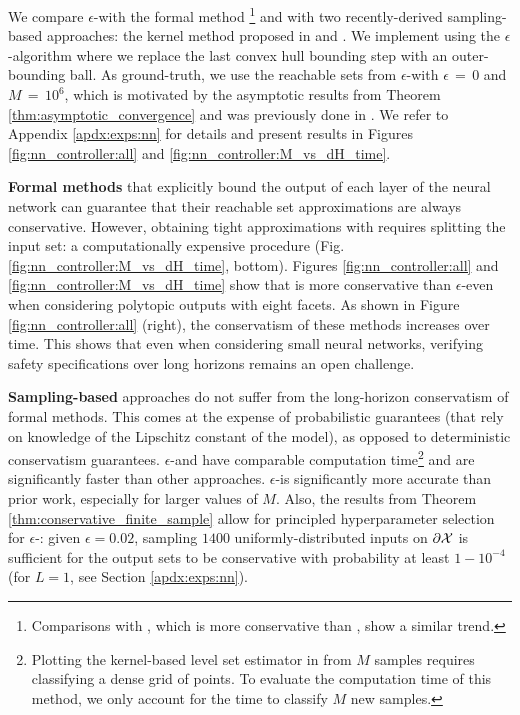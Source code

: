 \documentclass[12pt]{l4dc2022} %
\begin{document}
We compare $\epsilon$-\randup with the formal method \reachlp \citep{Everett21_journal}\footnote{Comparisons with \reachsdp \citep{Hu2020}, which is more conservative than \reachlp, show a similar trend.} %
% 
and with two recently-derived sampling-based approaches: the kernel method proposed in \citep{ThorpeL4DC2021} and \gotube \citep{Gruenbacher2021}. We implement \gotube using the $\epsilon$-\randup algorithm where we replace the last convex hull bounding step with an outer-bounding ball. 
As ground-truth, we use the reachable sets from $\epsilon$-\randup with $\epsilon\,{=}\,0$ and $M\,{=}\,10^6$, which is motivated by the asymptotic results from Theorem \ref{thm:asymptotic_convergence} and was previously done in \citep{Everett21_journal}. 
% 
 We refer to Appendix \ref{apdx:exps:nn} for details and present results in Figures \ref{fig:nn_controller:all} and \ref{fig:nn_controller:M_vs_dH_time}.

\textbf{Formal methods} that explicitly bound the output of each layer of the neural network can guarantee that %
their reachable set approximations are always conservative. %
However, obtaining tight approximations with \reachlp requires splitting the input set: a computationally expensive procedure (Fig.\,\ref{fig:nn_controller:M_vs_dH_time}, bottom). 
Figures \ref{fig:nn_controller:all}  and \ref{fig:nn_controller:M_vs_dH_time} show that \reachlp is more conservative than $\epsilon$-\randup even when considering polytopic outputs with eight facets. %
As shown in Figure \ref{fig:nn_controller:all} (right),  %
the conservatism of these methods increases over time. This shows that even when considering small neural networks, verifying safety specifications over long horizons remains an open challenge. 


% 
\textbf{Sampling-based} approaches %
do not suffer from the long-horizon conservatism of formal methods. 
This comes at the expense of probabilistic guarantees (that rely on knowledge of the Lipschitz constant of the model), as opposed to deterministic conservatism guarantees. %
% 
% 
$\epsilon$-\randup and \gotube have comparable computation time\footnote{%
Plotting the kernel-based level set estimator in \citep{ThorpeL4DC2021} from $M$ samples requires classifying a dense grid of points. To evaluate the computation time of this method, we only account for the time to classify $M$ new samples.}  and are significantly faster than other approaches. %
% 
$\epsilon$-\randup is significantly more accurate than prior work, especially for larger values of $M$. 
% 
% 
Also, the results from Theorem \ref{thm:conservative_finite_sample} allow for principled hyperparameter selection for $\epsilon$-\randup: given $\epsilon=0.02$, %
sampling $1400$ %
uniformly-distributed inputs on $\partial\mathcal{X}$ is sufficient for the output sets to be conservative with probability at least $1-10^{-4}$ (for $L=1$, see Section \ref{apdx:exps:nn}). 
% 
% 
\end{document}
